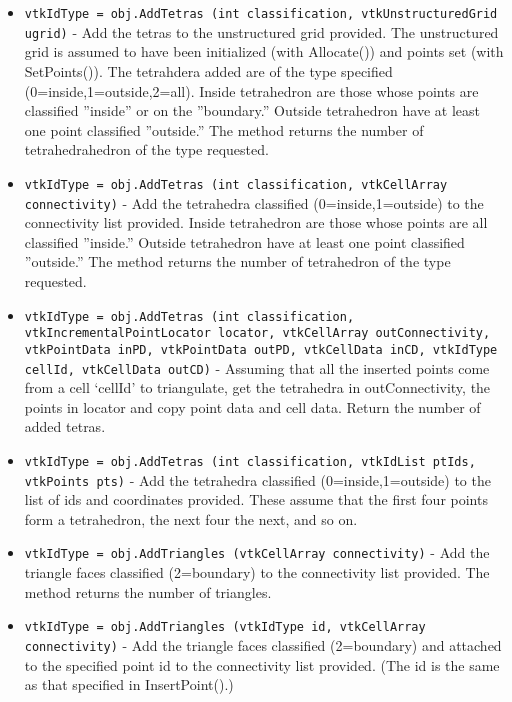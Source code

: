 \begin{itemize}
\item  \verb|vtkIdType = obj.AddTetras (int classification, vtkUnstructuredGrid ugrid)| -  Add the tetras to the unstructured grid provided. The unstructured
 grid is assumed to have been initialized (with Allocate()) and
 points set (with SetPoints()). The tetrahdera added are of the type
 specified (0=inside,1=outside,2=all). Inside tetrahedron are 
 those whose points are classified ''inside'' or on the ''boundary.'' 
 Outside tetrahedron have at least one point classified ''outside.'' 
 The method returns the number of tetrahedrahedron of the type 
 requested.

\item  \verb|vtkIdType = obj.AddTetras (int classification, vtkCellArray connectivity)| -  Add the tetrahedra classified (0=inside,1=outside) to the connectivity
 list provided. Inside tetrahedron are those whose points are all
 classified ''inside.'' Outside tetrahedron have at least one point
 classified ''outside.'' The method returns the number of tetrahedron
 of the type requested.    

\item  \verb|vtkIdType = obj.AddTetras (int classification, vtkIncrementalPointLocator locator, vtkCellArray outConnectivity, vtkPointData inPD, vtkPointData outPD, vtkCellData inCD, vtkIdType cellId, vtkCellData outCD)| -  Assuming that all the inserted points come from a cell `cellId' to
 triangulate, get the tetrahedra in outConnectivity, the points in locator
 and copy point data and cell data. Return the number of added tetras.
 
 
 
 
 
 

\item  \verb|vtkIdType = obj.AddTetras (int classification, vtkIdList ptIds, vtkPoints pts)| -  Add the tetrahedra classified (0=inside,1=outside) to the list
 of ids and coordinates provided. These assume that the first four points
 form a tetrahedron, the next four the next, and so on.

\item  \verb|vtkIdType = obj.AddTriangles (vtkCellArray connectivity)| -  Add the triangle faces classified (2=boundary) to the connectivity
 list provided. The method returns the number of triangles.

\item  \verb|vtkIdType = obj.AddTriangles (vtkIdType id, vtkCellArray connectivity)| -  Add the triangle faces classified (2=boundary) and attached to the
 specified point id to the connectivity list provided. (The id is the
 same as that specified in InsertPoint().)  


\end{itemize}
